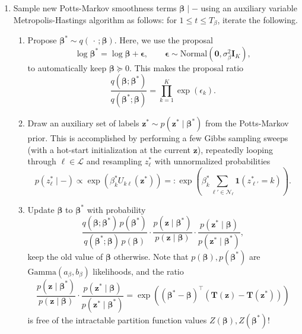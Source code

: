 \documentclass[12pt]{article}
\newcommand{\LL}{\mathcal{L}}
\newcommand{\NN}{\mathcal{N}}
\begin{document}
\begin{enumerate}[label=(\alph*)]
    \item Sample new Potts-Markov smoothness terms $\bm{\beta} \mid - $ using
    an auxiliary variable Metropolis-Hastings algorithm as follows: for $1 \leq
    t \leq T_{\beta}$, iterate the following.
    \begin{enumerate}[label=(\roman*)]
        \item Propose $\bm\beta^* \sim q(\,\cdot\,; \bm{\beta})$.
        Here, we use the proposal \[
            \log\bm{\beta}^* = \log\bm{\beta} + \bm\epsilon, \qquad
                \bm\epsilon \sim \text{Normal}\left(\bm0, \sigma_\beta^2 \bm{I}_K\right),
        \] to automatically keep $\bm\beta \succeq 0$.
        This makes the proposal ratio \[
            \frac{q(\bm{\beta}; \bm{\beta}^*)}{q(\bm{\beta}^*; \bm{\beta})}
                 = \prod_{k = 1}^K \exp(\epsilon_k).
        \]

        \item Draw an auxiliary set of labels $\bm{z}^* \sim p(\bm{z}^*\mid
        \bm{\beta}^*)$ from the Potts-Markov prior.
        This is accomplished by performing a few Gibbs sampling sweeps (with a
        hot-start initialization at the current $\bm{z}$), repeatedly looping
        through $\ell \in \LL$ and resampling $z_\ell^*$ with
        unnormalized probabilities \[
            p(z_\ell^* \mid - ) \propto \exp\left(\beta_k^* U_{k\ell}(\bm{z}^*)\right)
                =: \exp\left(\beta_k^* \sum_{\ell' \in \NN_\ell} \bm{1}(z_{\ell'}^* = k)\right).
        \]

        \item Update $\bm{\beta}$ to $\bm{\beta}^*$ with probability \[
            \frac{
                q(\bm{\beta}; \bm{\beta}^*)\,
                p(\bm{\beta}^*)
            }{
                q(\bm{\beta}^*; \bm{\beta})\,
                p(\bm{\beta})
            }\cdot \frac{
                p(\bm{z} \mid \bm{\beta}^*)
            }{
                p(\bm{z} \mid \bm{\beta})
            }\cdot \frac{
                p(\bm{z}^*\mid \bm{\beta})
            }{
                p(\bm{z}^* \mid \bm{\beta}^*)
            },
        \] keep the old value of $\bm{\beta}$ otherwise.
        Note that $p(\bm{\beta}), p(\bm{\beta}^*)$ are $\text{Gamma}(a_\beta,
        b_\beta)$ likelihoods, and the ratio \[
            \frac{
                p(\bm{z} \mid \bm{\beta}^*)
            }{
                p(\bm{z} \mid \bm{\beta})
            }\cdot \frac{
                p(\bm{z}^*\mid \bm{\beta})
            }{
                p(\bm{z}^* \mid \bm{\beta}^*)
            } = \exp\left(
                (\bm{\beta}^* - \bm{\beta})^\top (\bm{T}(\bm{z}) - \bm{T}(\bm{z}^*))
            \right)
        \] is free of the intractable partition function values $Z(\bm\beta),
        Z(\bm\beta^*)$!
    \end{enumerate}
\end{enumerate}
\end{document}
